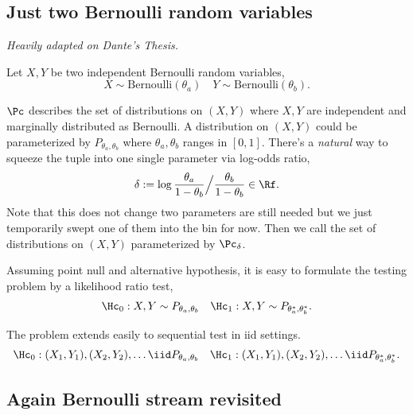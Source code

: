\subsection{Just two Bernoulli random variables}

\emph{Heavily adapted on Dante's Thesis.}

Let $X,Y$ be two independent Bernoulli random variables,
\begin{equation*}
	X \sim \mathrm{Bernoulli}(\theta_a) \quad
	Y \sim \mathrm{Bernoulli}(\theta_b).
\end{equation*}

$\Pc$ describes the set of distributions on $(X,Y)$ 
where $X,Y$ are independent and marginally distributed as Bernoulli.
A distribution on $(X,Y)$ could be parameterized by
$P_{\theta_a,\theta_b}$ where $\theta_a,\theta_b$ ranges in $[0,1]$.
There's a \emph{natural} way to squeeze the tuple into one single parameter via log-odds ratio,
\begin{equation*}
	\delta:= \log \frac{\theta_a}{1-\theta_b} \Big/ \frac{\theta_b}{1-\theta_b} \in \Rf.
\end{equation*}
Note that this does not change two parameters are still needed 
but we just temporarily swept one of them into the bin for now.
Then we call the set of distributions on $(X,Y)$ parameterized by $\Pc_{\delta}$.

Assuming point null and alternative hypothesis,
it is easy to formulate the testing problem by a likelihood ratio test,
\begin{align*}
	\Hc_0: X,Y \sim P_{\theta_a,\theta_b} \quad
	\Hc_1: X,Y \sim P_{\theta_a^*,\theta_b^*}.
\end{align*}

The problem extends easily to sequential test in iid settings.
\begin{align*}
	\Hc_0: (X_1,Y_1),(X_2,Y_2),\dots \iid P_{\theta_a,\theta_b} \quad
	\Hc_1: (X_1,Y_1),(X_2,Y_2),\dots \iid P_{\theta_a^*,\theta_b^*}.
\end{align*}






\subsection*{Again Bernoulli stream revisited}

